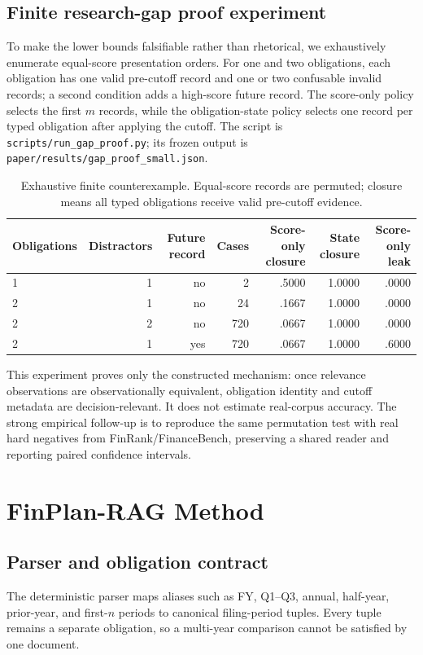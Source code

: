 \documentclass[12pt]{article}
\begin{document}
\subsection{Finite research-gap proof experiment}
To make the lower bounds falsifiable rather than rhetorical, we exhaustively enumerate equal-score presentation orders. For one and two obligations, each obligation has one valid pre-cutoff record and one or two confusable invalid records; a second condition adds a high-score future record. The score-only policy selects the first $m$ records, while the obligation-state policy selects one record per typed obligation after applying the cutoff. The script is \texttt{scripts/run\_gap\_proof.py}; its frozen output is \texttt{paper/results/gap\_proof\_small.json}.

\begin{table}[t]\centering\small
\caption{Exhaustive finite counterexample. Equal-score records are permuted; closure means all typed obligations receive valid pre-cutoff evidence.}
\begin{tabular}{lrrrrrr}
\toprule
Obligations & Distractors & Future record & Cases & Score-only closure & State closure & Score-only leak\\
\midrule
1 & 1 & no & 2 & .5000 & 1.0000 & .0000\\
2 & 1 & no & 24 & .1667 & 1.0000 & .0000\\
2 & 2 & no & 720 & .0667 & 1.0000 & .0000\\
2 & 1 & yes & 720 & .0667 & 1.0000 & .6000\\
\bottomrule
\end{tabular}
\end{table}

This experiment proves only the constructed mechanism: once relevance observations are observationally equivalent, obligation identity and cutoff metadata are decision-relevant. It does not estimate real-corpus accuracy. The strong empirical follow-up is to reproduce the same permutation test with real hard negatives from FinRank/FinanceBench, preserving a shared reader and reporting paired confidence intervals.

\section{FinPlan-RAG Method}
\subsection{Parser and obligation contract}
The deterministic parser maps aliases such as FY, Q1--Q3, annual, half-year, prior-year, and first-$n$ periods to canonical filing-period tuples. Every tuple remains a separate obligation, so a multi-year comparison cannot be satisfied by one document.
\end{document}
